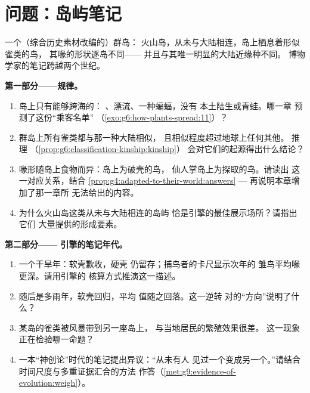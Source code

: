 \section{问题：岛屿笔记}

\begin{problem}\label{pb:g9:how-species-change:1}
一个（综合历史素材改编的）群岛：
火山岛，从未与大陆相连，岛上栖息着形似雀类的鸟，
其喙的形状逐岛不同——
并且与其唯一明显的大陆近缘种不同。
博物学家的笔记跨越两个世纪。

\medskip\noindent\textbf{第一部分——规律。}
\begin{enumerate}
  \item 岛上只有能够跨海的：
        、漂流、一种蝙蝠，没有
        本土陆生或青蛙。哪一章
        预测了这份“乘客名单”
        （\cref{exo:g6:how-plants-spread:11}）？
  \item 群岛上所有雀类都与那一种大陆相似，
        且相似程度超过地球上任何其他。
        推理
        （\cref{prop:g6:classification-kinship:kinship}）
        会对它们的起源得出什么结论？
  \item 喙形随岛上食物而异：岛上为破壳的鸟，
        仙人掌岛上为探取的鸟。请读出
        这一对应关系，结合
        \cref{prop:g4:adapted-to-their-world:answers} ---
        再说明本章增加了那一章所
        无法给出的内容。
  \item 为什么火山岛这类从未与大陆相连的岛屿
        恰是引擎的最佳展示场所？请指出它们
        大量提供的形成要素。
\end{enumerate}

\medskip\noindent\textbf{第二部分——
引擎的笔记年代。}
\begin{enumerate}[resume]
  \item 一个干旱年：软壳歉收，硬壳
        仍留存；捕鸟者的卡尺显示次年的
        雏鸟平均喙更深。请用引擎的
        核算方式推演这一描述。
  \item 随后是多雨年，软壳回归，平均
        值随之回落。这一逆转
        对的“方向”说明了什么？
  \item 某岛的雀类被风暴带到另一座岛上，
        与当地居民的繁殖效果很差。
        这一现象正在检验哪一命题？
  \item 一本“神创论”时代的笔记提出异议：“从未有人
        见过一个变成另一个。”请结合
        时间尺度与多重证据汇合的方法
        作答（\cref{met:g9:evidence-of-evolution:weigh}）。
\end{enumerate}


\end{problem}
